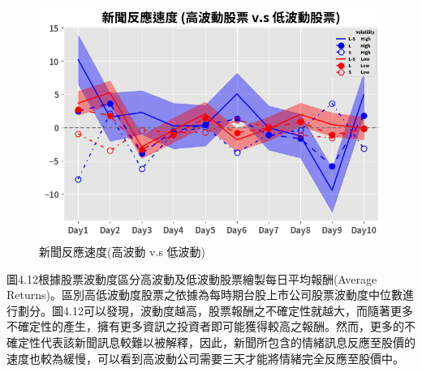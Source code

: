 \begin{figure}[htbp]
\centering
\includegraphics[width=1.1\textwidth]{images/speed3.png}
\caption{新聞反應速度(高波動 v.s 低波動)}
\end{figure}
圖4.12根據股票波動度區分高波動及低波動股票繪製每日平均報酬(Average Returns)。區別高低波動度股票之依據為每時期台股上市公司股票波動度中位數進行劃分。圖4.12可以發現，波動度越高，股票報酬之不確定性就越大，而隨著更多不確定性的產生，擁有更多資訊之投資者即可能獲得較高之報酬。然而，更多的不確定性代表該新聞訊息較難以被解釋，因此，新聞所包含的情緒訊息反應至股價的速度也較為緩慢，可以看到高波動公司需要三天才能將情緒完全反應至股價中。














